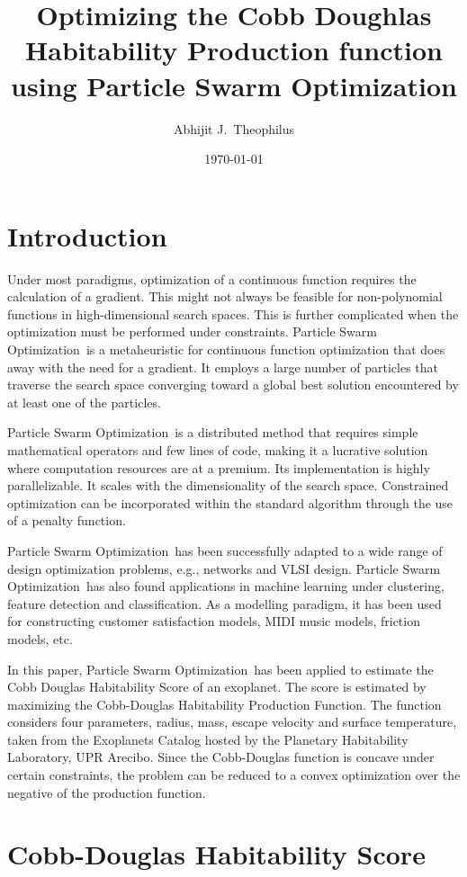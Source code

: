 \documentclass{article}
\title{Optimizing the Cobb Doughlas Habitability Production function using
Particle Swarm Optimization}
\author{Abhijit J.\ Theophilus}
\date{\today}
\newcommand{\pso}{Particle Swarm Optimization}
\begin{document}
\maketitle

\section{Introduction}
Under most paradigms, optimization of a continuous function requires the calculation of a gradient. This might not
always be feasible for non-polynomial functions in high-dimensional search spaces. This is further complicated when the
optimization must be performed under constraints. \pso\ is a metaheuristic for continuous function optimization that does
away with the need for a gradient. It employs a large number of particles that traverse the search space converging
toward a global best solution encountered by at least one of the particles.

\pso\ is a distributed method that requires simple mathematical operators and few lines of code, making it a lucrative
solution where computation resources are at a premium. Its implementation is highly parallelizable. It scales with the
dimensionality of the search space. Constrained optimization can be incorporated within the standard algorithm through
the use of a penalty function.

\pso\ has been successfully adapted to a wide range of design optimization problems, e.g., networks and VLSI design.
\pso\ has also found applications in machine learning under clustering, feature detection and classification.  As a
modelling paradigm, it has been used for constructing customer satisfaction models, MIDI music models, friction models,
etc.

In this paper, \pso\ has been applied to estimate the Cobb Douglas Habitability Score of an exoplanet. The score is
estimated by maximizing the Cobb-Douglas Habitability Production Function. The function considers four parameters,
radius, mass, escape velocity and surface temperature, taken from the Exoplanets Catalog hosted by the Planetary
Habitability Laboratory, UPR Arecibo. Since the Cobb-Douglas function is concave under certain constraints, the
problem can be reduced to a convex optimization over the negative of the production function.


\section{Cobb-Douglas Habitability Score}
\end{document}
